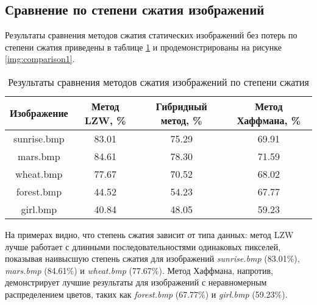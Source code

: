 \subsection{Сравнение по степени сжатия изображений}

Результаты сравнения методов сжатия статических изображений без потерь по степени сжатия приведены в таблице \ref{tbl:compression_ratio} и продемонстрированы на рисунке \ref{img:comparison1}.
\captionsetup{justification=raggedleft,singlelinecheck=false}
\begin{table}[H]
    \centering
        \caption{Результаты сравнения методов сжатия изображений по степени сжатия}
        \label{tbl:compression_ratio}
        \begin{tabular}{|c|c|c|c|}
            \hline
            \textbf{Изображение}
            & \begin{minipage}[t]{4cm}\centering\textbf{Метод LZW, \%}\end{minipage} 
            & \begin{minipage}[t]{4cm}\centering\textbf{Гибридный метод, \%}\end{minipage}
            & \begin{minipage}[t]{4cm}\centering\textbf{Метод Хаффмана, \%}\end{minipage} \\ \hline
            sunrise.bmp &  83.01  &  75.29  &  69.91  \\ \hline
            mars.bmp    &  84.61  &  78.30  &  71.59  \\ \hline
            wheat.bmp   &  77.67  &  70.52  &  68.02  \\ \hline
            forest.bmp  &  44.52  &  54.23  &  67.77  \\ \hline
            girl.bmp    &  40.84  &  48.05  &  59.23  \\ \hline
        \end{tabular}
\end{table}


На примерах видно, что степень сжатия зависит от типа данных: метод LZW лучше работает с длинными последовательностями одинаковых пикселей, показывая наивысшую степень сжатия для изображений \textit{sunrise.bmp} (83.01\%), \textit{mars.bmp} (84.61\%) и \textit{wheat.bmp} (77.67\%). Метод Хаффмана, напротив, демонстрирует лучшие результаты для изображений с неравномерным распределением цветов, таких как \textit{forest.bmp} (67.77\%) и \textit{girl.bmp} (59.23\%).

